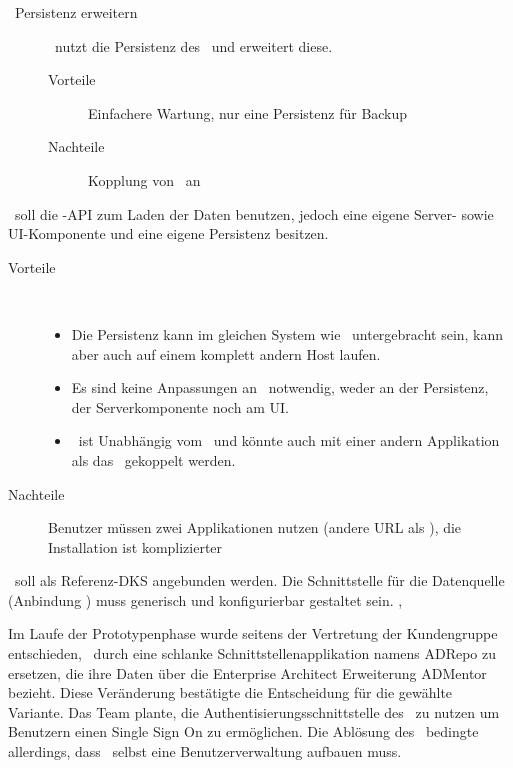 {{\begin{description}
						\item[\cdar\ Persistenz erweitern]
						\eeppi\ nutzt die Persistenz des \cdar\ und erweitert diese.
						\begin{description}
							\item[Vorteile] Einfachere Wartung, nur eine Persistenz für Backup
							\item[Nachteile] Kopplung von \eeppi\ an \cdar
						\end{description}
					\end{description}
				}
				{
					\eeppi\ soll die \cdar-API zum Laden der Daten benutzen, jedoch eine eigene Server- sowie UI-Komponente und eine eigene Persistenz besitzen. 
					\begin{description}
						\item[Vorteile] \
							\begin{itemize}
								\item Die Persistenz kann im gleichen System wie \cdar\ untergebracht sein, kann aber auch auf einem komplett andern Host laufen.
								\item Es sind keine Anpassungen an \cdar\ notwendig, weder an der Persistenz, der Serverkomponente noch am UI.
								\item \eeppi\ ist Unabhängig vom \cdar\ und könnte auch mit einer andern Applikation als das \cdar\ gekoppelt werden.
							\end{itemize}
						\item[Nachteile] Benutzer müssen zwei Applikationen nutzen (andere URL als \cdar), die Installation ist komplizierter
					\end{description}
				}
				{\cdar\ soll als Referenz-DKS angebunden werden.}
				{Die Schnittstelle für die Datenquelle (Anbindung \cdar) muss generisch und konfigurierbar gestaltet sein.}
				{
					, 
				}
			}
			
			
			Im Laufe der Prototypenphase wurde seitens der Vertretung der Kundengruppe entschieden, 
			\cdar\ durch eine schlanke Schnittstellenapplikation namens ADRepo zu ersetzen, 
			die ihre Daten über die Enterprise Architect Erweiterung ADMentor bezieht. 
			Diese Veränderung bestätigte die Entscheidung für die gewählte Variante.
			Das Team plante, die Authentisierungsschnittstelle des \cdar\ zu nutzen um Benutzern einen Single Sign On zu ermöglichen.
			Die Ablösung des \cdar\ bedingte allerdings, dass \eeppi\ selbst eine Benutzerverwaltung aufbauen muss.
		

